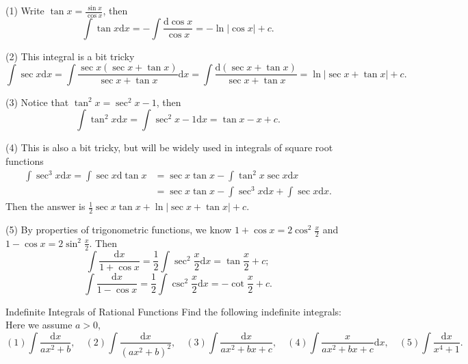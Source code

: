 \begin{solution}
  (1) Write $\tan x = \frac{\sin x}{\cos x}$, then
  \begin{equation}
    \int \tan x \mathrm{d} x = - \int \frac{\mathrm{d} \cos x}{\cos x}
    = - \ln |\cos x| + c.
  \end{equation}

  (2) This integral is a bit tricky
  \begin{equation}
    \int \sec x \mathrm{d} x = \int \frac{\sec x (\sec x + \tan x)}{\sec x + \tan x} \mathrm{d} x
     = \int \frac{\mathrm{d} (\sec x + \tan x)}{\sec x + \tan x} = \ln |\sec x + \tan x| + c.
  \end{equation}

  (3) Notice that $\tan ^2 x = \sec^2 x - 1$, then
  \begin{equation}
    \int \tan^2 x \mathrm{d} x = \int \sec^2 x - 1\mathrm{d} x
    = \tan x - x + c.
  \end{equation}

  (4) This is also a bit tricky, but will be widely used in integrals of square
  root functions
  \begin{align}
    \int \sec^3 x \mathrm{d} x = \int \sec x \mathrm{d} \tan x
    &= \sec x \tan x - \int \tan^2 x \sec x \mathrm{d} x\\
    &= \sec x \tan x - \int \sec^3 x\mathrm{d} x + \int \sec x \mathrm{d} x.
  \end{align}
  Then the answer is $\frac{1}{2}\sec x \tan x + \ln |\sec x + \tan x| + c$.

  (5) By properties of trigonometric functions, we know
  $1 + \cos x = 2 \cos^2 \frac{x}{2}$ and $1 - \cos x = 2 \sin^2 \frac{x}{2}$.
  Then
  \begin{equation}
    \int \frac{\mathrm{d} x}{1 + \cos x} = \frac{1}{2} \int \sec^2 \frac{x}{2}\mathrm{d} x
    = \tan \frac{x}{2} + c;
  \end{equation}
  \begin{equation}
    \int \frac{\mathrm{d} x}{1 - \cos x} = \frac{1}{2} \int \csc^2 \frac{x}{2} \mathrm{d} x
    = - \operatorname{cot} \frac{x}{2} + c.
  \end{equation}
\end{solution}

\begin{example}{Indefinite Integrals of Rational Functions}{}
  Find the following indefinite integrals: Here we assume $a > 0$, 
  \begin{equation}
    (1) \int \frac{\mathrm{d} x}{ax^2 + b}, \quad
    (2) \int  \frac{\mathrm{d} x}{(ax^2 + b)^2}, \quad
    (3) \int \frac{\mathrm{d} x}{ax^2 + bx + c}, \quad
    (4) \int \frac{x}{ax^2 + bx + c}\mathrm{d} x, \quad
    (5) \int \frac{\mathrm{d} x}{x^4 + 1}.
  \end{equation}
\end{example}

